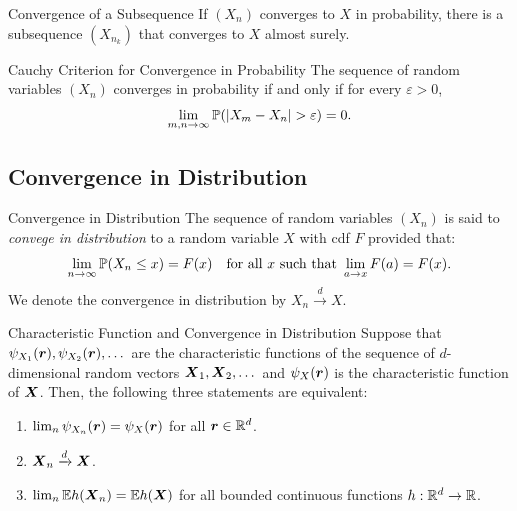 \begin{prop}{Convergence of a Subsequence}{}
	If $(X_n)$ converges to $X$ in probability, there is a subsequence $(X_{n_k})$ that converges to $X$ almost surely.
\end{prop}

\begin{prop}{Cauchy Criterion for Convergence in Probability}{}
	The sequence of random variables $(X_n)$ converges in probability if and only if for every $\varepsilon > 0$,
	\begin{equation}
		\lim_{m,n \to \infty} \mathbb{P}(|X_m - X_n| > \varepsilon) = 0.
		\label{eq:CauchyCriterionProbability}
	\end{equation}
\end{prop}

\subsection{Convergence in Distribution}
\begin{defn}{Convergence in Distribution}{}
	The sequence of random variables $(X_n)$ is said to \textit{convege in distribution} to a random variable $X$ with cdf $F$ provided that:
	\begin{equation}
		\lim_{n \to \infty} \mathbb{P}(X_n \le x) = F(x) \quad \text{for all } x \text{ such that } \lim_{a \to x} F(a) = F(x).
		\label{eq:ConvergenceInDistributionDef}
	\end{equation}
	We denote the convergence in distribution by $X_n \xrightarrow{d} X$.
\end{defn}

\begin{thm}{Characteristic Function and Convergence in Distribution}{}
	Suppose that $\psi_{X_1}(\boldsymbol{r}), \psi_{X_2}(\boldsymbol{r}), \dots$ are the characteristic functions of the sequence of $d$-dimensional random vectors $\boldsymbol{X}_1, \boldsymbol{X}_2, \dots$ and $\psi_X(\boldsymbol{r})$ is the characteristic function of $\boldsymbol{X}$. Then, the following three statements are equivalent:
	\begin{enumerate}
		\item $\lim_{n} \psi_{X_n}(\boldsymbol{r}) = \psi_X(\boldsymbol{r})$ for all $\boldsymbol{r} \in \mathbb{R}^d$.
		\item $\boldsymbol{X}_n \xrightarrow{d} \boldsymbol{X}$.
		\item $\lim_n \mathbb{E} h(\boldsymbol{X}_n) = \mathbb{E} h(\boldsymbol{X})$ for all bounded continuous functions $h: \mathbb{R}^d \to \mathbb{R}$.
	\end{enumerate}
\end{thm}

